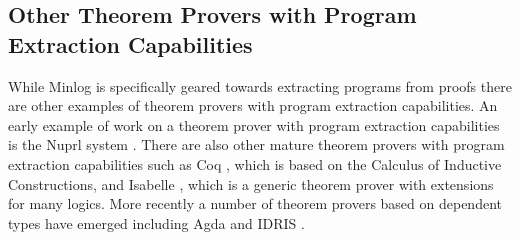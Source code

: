\subsection*{Other Theorem Provers with Program Extraction Capabilities}
While Minlog is specifically geared towards extracting programs from proofs there are other examples of theorem provers with program extraction capabilities. An early example of work on a theorem prover with program extraction capabilities is the Nuprl system \cite{RC86}. There are also other mature theorem provers with program extraction capabilities such as Coq \cite{YB04}, which is based on the Calculus of Inductive Constructions, and Isabelle  \cite{TN99,LP94}, which is a generic theorem prover with extensions for many logics. More recently a number of theorem provers based on dependent types \cite{PM80} have emerged including Agda \cite{AB09} and IDRIS \cite{EB11}.
